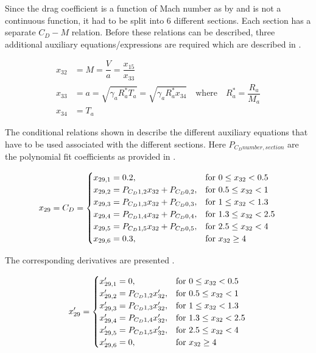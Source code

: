 Since the drag coefficient is a function of Mach number as by  and is not a continuous function, it had to be split into 6 different sections. Each section has a separate $C_{D}-M$ relation. Before these relations can be described, three additional auxiliary equations/expressions are required which are described in .

 \begin{equation} \label{eq:cdAux}
\begin{split}
x_{32} &= M = \dfrac{V}{a} = \dfrac{x_{15}}{x_{33}}\\
x_{33} &= a = \sqrt{\gamma_{a}R_{a}^{*}T_{a}} = \sqrt{\gamma_{a}R_{a}^{*}x_{34}} \quad \text{where} \quad R_{a}^{*}=\dfrac{R_{a}}{M_{a}} \\
x_{34} &= T_{a}
\end{split}
\end{equation}

The conditional relations shown in  describe the different auxiliary equations that have to be used associated with the different sections. Here $P_{C_{D} number,section}$ are the polynomial fit coefficients as provided in .

\begin{equation}\label{eq:cdCond}
x_{29}=C_{D}=\begin{cases}
x_{29,1}=0.2, & \text{for } 0\leq x_{32} < 0.5\\
x_{29,2}=P_{C_{D} 1,2}x_{32}+P_{C_{D} 0,2}, &  \text{for } 0.5\leq x_{32} < 1 \\
x_{29,3}=P_{C_{D} 1,3}x_{32}+P_{C_{D} 0,3}, &  \text{for } 1\leq x_{32} < 1.3 \\
x_{29,4}=P_{C_{D} 1,4}x_{32}+P_{C_{D} 0,4}, &  \text{for } 1.3\leq x_{32} < 2.5 \\
x_{29,5}=P_{C_{D} 1,5}x_{32}+P_{C_{D} 0,5}, &  \text{for } 2.5\leq x_{32} < 4 \\
x_{29,6}=0.3, &  \text{for } x_{32} \geq 4 
\end{cases}\\
\end{equation}

The corresponding derivatives are presented .

\begin{equation}\label{eq:cdCondDer}
x'_{29}=\begin{cases}
x'_{29,1}=0, & \text{for } 0\leq x_{32} < 0.5\\
x'_{29,2}=P_{C_{D} 1,2}x'_{32}, &  \text{for } 0.5\leq x_{32} < 1 \\
x'_{29,3}=P_{C_{D} 1,3}x'_{32}, &  \text{for } 1\leq x_{32} < 1.3 \\
x'_{29,4}=P_{C_{D} 1,4}x'_{32}, &  \text{for } 1.3\leq x_{32} < 2.5 \\
x'_{29,5}=P_{C_{D} 1,5}x'_{32}, &  \text{for } 2.5\leq x_{32} < 4 \\
x'_{29,6}=0, &  \text{for } x_{32} \geq 4 
\end{cases}\\
\end{equation}

